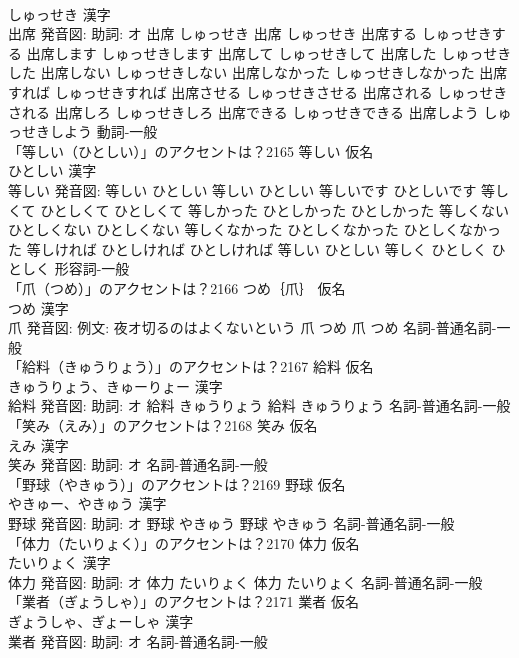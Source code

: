 \documentclass[8pt]{extreport}
\begin{document}
\begin{CJK}{UTF8}{min}
\\	しゅっせき 漢字　
\\	出席 発音図: 助詞: オ	出席 しゅっせき		出席 しゅっせき 出席する しゅっせきする 出席します しゅっせきします 出席して しゅっせきして 出席した しゅっせきした 出席しない しゅっせきしない 出席しなかった しゅっせきしなかった 出席すれば しゅっせきすれば 出席させる しゅっせきさせる 出席される しゅっせきされる 出席しろ しゅっせきしろ 出席できる しゅっせきできる 出席しよう しゅっせきしよう				動詞-一般 
\\	「等しい（ひとしい）」のアクセントは？2165	等しい 仮名　
\\	ひとしい 漢字　
\\	等しい 発音図:	等しい ひとしい		等しい ひとしい 等しいです ひとしいです 等しくて ひとしくて ひとしくて 等しかった ひとしかった ひとしかった 等しくない ひとしくない ひとしくない 等しくなかった ひとしくなかった ひとしくなかった 等しければ ひとしければ ひとしければ 等しい ひとしい 等しく ひとしく ひとしく				形容詞-一般 
\\	「爪（つめ）」のアクセントは？2166	つめ｛爪｝ 仮名　
\\	つめ 漢字　
\\	爪 発音図: 例文: 夜オ切るのはよくないという	爪 つめ		爪 つめ				名詞-普通名詞-一般 
\\	「給料（きゅうりょう）」のアクセントは？2167	給料 仮名　
\\	きゅうりょう、きゅーりょー 漢字　
\\	給料 発音図: 助詞: オ	給料 きゅうりょう		給料 きゅうりょう				名詞-普通名詞-一般 
\\	「笑み（えみ）」のアクセントは？2168	笑み 仮名　
\\	えみ 漢字　
\\	笑み 発音図: 助詞: オ							名詞-普通名詞-一般 
\\	「野球（やきゅう）」のアクセントは？2169	野球 仮名　
\\	やきゅー、やきゅう 漢字　
\\	野球 発音図: 助詞: オ	野球 やきゅう		野球 やきゅう				名詞-普通名詞-一般 
\\	「体力（たいりょく）」のアクセントは？2170	体力 仮名　
\\	たいりょく 漢字　
\\	体力 発音図: 助詞: オ	体力 たいりょく		体力 たいりょく				名詞-普通名詞-一般 
\\	「業者（ぎょうしゃ）」のアクセントは？2171	業者 仮名　
\\	ぎょうしゃ、ぎょーしゃ 漢字　
\\	業者 発音図: 助詞: オ							名詞-普通名詞-一般 

\end{CJK}
\end{document}
